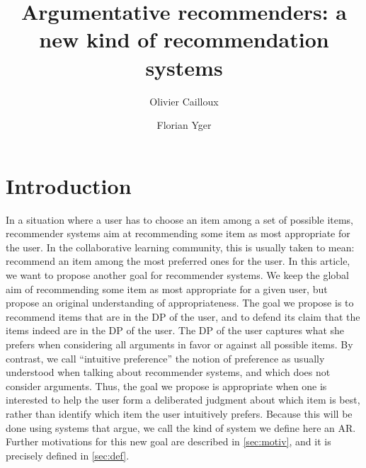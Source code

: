 \documentclass[version=3.21, pagesize, twoside=off, bibliography=totoc, DIV=calc, fontsize=12pt, a4paper, french, english]{scrartcl}
\begin{document}
\title{%
	Argumentative recommenders: a new kind of recommendation systems%
}
\author{Olivier Cailloux}
\author{Florian Yger}
\makeatletter
\makeatother
\maketitle

\acresetall

\section{Introduction}
\label{sec:intro}
In a situation where a user has to choose an item among a set of possible items, recommender systems aim at recommending some item as most appropriate for the user.
In the collaborative learning community, this is usually taken to mean: recommend an item among the most preferred ones for the user. 
In this article, we want to propose another goal for recommender systems. We keep the global aim of recommending some item as most appropriate for a given user, but propose an original understanding of appropriateness. The goal we propose is to recommend items that are in the \ac{DP} of the user, and to defend its claim that the items indeed are in the \ac{DP} of the user. The \ac{DP} of the user captures what she prefers when considering all arguments in favor or against all possible items. By contrast, we call “intuitive preference” the notion of preference as usually understood when talking about recommender systems, and which does not consider arguments. Thus, the goal we propose is appropriate when one is interested to help the user form a deliberated judgment about which item is best, rather than identify which item the user intuitively prefers. Because this will be done using systems that argue, we call the kind of system we define here an \ac{AR}.
Further motivations for this new goal are described in \cref{sec:motiv}, and it is precisely defined in \cref{sec:def}.
\end{document}
